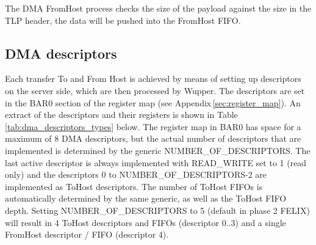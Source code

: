 The DMA FromHost process checks the size of the payload against the size in the TLP header, the data will be pushed into the FromHost FIFO.

\subsection{DMA descriptors}
\label{sec:dma_descriptors}
Each transfer To and From Host is achieved by means of setting up descriptors on the server side, which are then processed by Wupper.
The descriptors are set in the BAR0 section of the register map (see Appendix\,\ref{sec:register_map}). An extract of the descriptors and their registers is shown in Table\,\ref{tab:dma_descriptors_types} below. The register map in BAR0 has space for a maximum of 8 DMA descriptors, but the actual number of descriptors that are implemented is determined by the generic NUMBER\_OF\_DESCRIPTORS. The last active descriptor is always implemented with READ\_WRITE set to 1 (read only) and the descriptors 0 to NUMBER\_OF\_DESCRIPTORS-2 are implemented as ToHost descriptors. The number of ToHost FIFOs is automatically determined by the same generic, as well as the ToHost FIFO depth. Setting NUMBER\_OF\_DESCRIPTORS to 5 (default in phase 2 FELIX) will result in 4 ToHost descriptors and FIFOs (descriptor 0..3) and a single FromHost descriptor / FIFO (descriptor 4).


